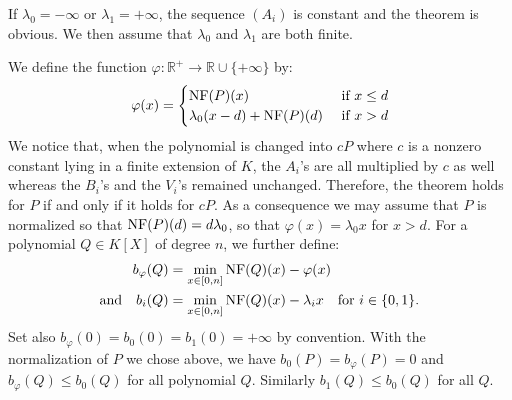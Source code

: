 \documentclass{sig-alternate-05-2015}
\DeclareMathOperator{\NP}{NP}
\newcommand{\slp}{\text{\rm slp}}
\newcommand{\R}{\mathbb R}
\newcommand{\NF}{\text{\rm NF}}
\begin{document}
\begin{comment}
This is enough to conclude on the Newton polygon of $R_{i+1}.$
Indeed, thanks to \eqref{eq:Riplus}, we obtain that 
\[\NP (R_i) \geq -\lambda_0+2^i(\lambda_1-\lambda_0)+(d-1) \slp (\lambda_0). \]
We can proceed similarly for $1-V_{i+1} B_{i+1}$ using \eqref{eq:ViBiplus}.

Finally, we can apply \eqref{eqdef:Si2} for $i+1,$
\begin{align*}
S_{i+1} & = (B_{i+1} R_{i+1} + (1-V_{i+1} B_{i+1}) S_{i} \\
& + (1-V_{i+1} B_{i+1})(S_{i+1}-S_{i})) \% A_{i+1},
\end{align*}
to obtain the desired minoration on $\NP (S_{i+1}).$ This concludes the proof.
\end{proof}

\subsubsection{Xavier's proof}
\end{comment}

If $\lambda_0 = -\infty$ or $\lambda_1 = +\infty$, the sequence $(A_i)$
is constant and the theorem is obvious. We then assume that $\lambda_0$
and $\lambda_1$ are both finite.

We define the function $\varphi : \R^+ \to \R 
\cup \{+\infty\}$ by:
\begin{equation} \label{eqdef:functionphi}
\varphi(x) = \begin{cases} \NF(P)(x) &\mbox{ if $x \leq d$} \\
\lambda_0 (x - d) + \NF(P)(d) &\mbox{ if $x > d$} \end{cases}
\end{equation}
We notice that, when the polynomial is changed into $cP$ where $c$ is a 
nonzero constant lying in a finite extension of $K$, the $A_i$'s are all 
multiplied by $c$ as well whereas the $B_i$'s and the $V_i$'s remained 
unchanged. Therefore, the theorem holds for $P$ if and only if it holds 
for $cP$. As a consequence we may assume that $P$ is normalized so that 
$\NF(P)(d) = d \lambda_0$, so that $\varphi(x) = \lambda_0 x$ for $x > d$.
For a polynomial $Q \in K[X]$ of degree $n$, we further define:
\begin{align}
b_\varphi(Q) & = \min_{x \in [0,n]} \NF(Q)(x) - \varphi(x) 
\label{eqdef:bphi} \\
\text{and} \quad
b_i(Q) & = \min_{x \in [0,n]} \NF(Q)(x) - \lambda_i x
\quad \text{for } i \in \{0,1\}.
\label{eqdef:b0}
\end{align}
Set also $b_\varphi(0) = b_0(0) = b_1(0) = +\infty$ by convention.
With the normalization of $P$ we chose above, we have $b_0(P)
= b_\varphi(P) = 0$ and $b_\varphi(Q) \leq b_0(Q)$ for all polynomial
$Q$. Similarly $b_1(Q) \leq b_0(Q)$ for all $Q$.
\end{document}
